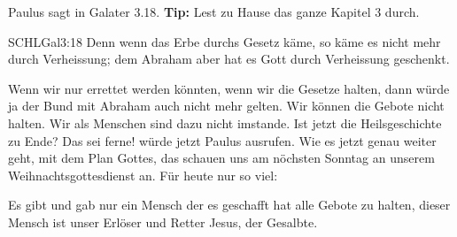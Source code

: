     Paulus sagt in Galater 3.18. \textbf{Tip:} Lest zu Hause das ganze Kapitel 3 durch.
    \begin{bibelquote}{SCHL}{Gal}{3:18}
       Denn wenn das Erbe durchs Gesetz käme, so käme es nicht mehr durch Verheissung; dem Abraham aber hat es Gott durch Verheissung geschenkt.
   \end{bibelquote}
    Wenn wir nur errettet werden könnten, wenn wir die Gesetze halten, dann würde ja der Bund mit Abraham auch nicht mehr gelten.
    Wir können die Gebote nicht halten. Wir als Menschen sind dazu nicht imstande. Ist jetzt die Heilsgeschichte zu Ende? Das sei ferne! würde jetzt Paulus ausrufen. Wie es jetzt genau weiter geht, mit dem Plan Gottes, das schauen uns am nöchsten Sonntag an unserem Weihnachtsgottesdienst an. Für heute nur so viel:
    
    Es gibt und gab nur ein Mensch der es geschafft hat alle Gebote zu halten, dieser Mensch ist unser Erlöser und Retter Jesus, der Gesalbte.
